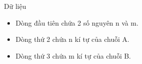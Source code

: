 Dữ liệu
\begin{itemize}
	\item     Dòng đầu tiên chứa 2 số nguyên n và m.   
	\item     Dòng thứ 2 chứa n kí tự của chuỗi A.   
	\item     Dòng thứ 3 chứa m kí tự của chuỗi B.   
\end{itemize}